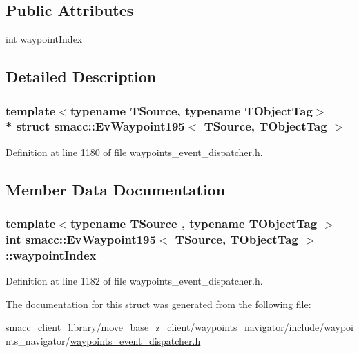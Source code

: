 \subsection*{Public Attributes}
\begin{DoxyCompactItemize}
\item 
int \hyperlink{structsmacc_1_1EvWaypoint195_ace2857a55e4fccb7df663da8283658bc}{waypoint\+Index}
\end{DoxyCompactItemize}


\subsection{Detailed Description}
\subsubsection*{template$<$typename T\+Source, typename T\+Object\+Tag$>$\\*
struct smacc\+::\+Ev\+Waypoint195$<$ T\+Source, T\+Object\+Tag $>$}



Definition at line 1180 of file waypoints\+\_\+event\+\_\+dispatcher.\+h.



\subsection{Member Data Documentation}
\subsubsection[{\texorpdfstring{waypoint\+Index}{waypointIndex}}]{\setlength{\rightskip}{0pt plus 5cm}template$<$typename T\+Source , typename T\+Object\+Tag $>$ int {\bf smacc\+::\+Ev\+Waypoint195}$<$ T\+Source, T\+Object\+Tag $>$\+::waypoint\+Index}\hypertarget{structsmacc_1_1EvWaypoint195_ace2857a55e4fccb7df663da8283658bc}{}\label{structsmacc_1_1EvWaypoint195_ace2857a55e4fccb7df663da8283658bc}


Definition at line 1182 of file waypoints\+\_\+event\+\_\+dispatcher.\+h.



The documentation for this struct was generated from the following file\+:\begin{DoxyCompactItemize}
\item 
smacc\+\_\+client\+\_\+library/move\+\_\+base\+\_\+z\+\_\+client/waypoints\+\_\+navigator/include/waypoints\+\_\+navigator/\hyperlink{waypoints__event__dispatcher_8h}{waypoints\+\_\+event\+\_\+dispatcher.\+h}\end{DoxyCompactItemize}
